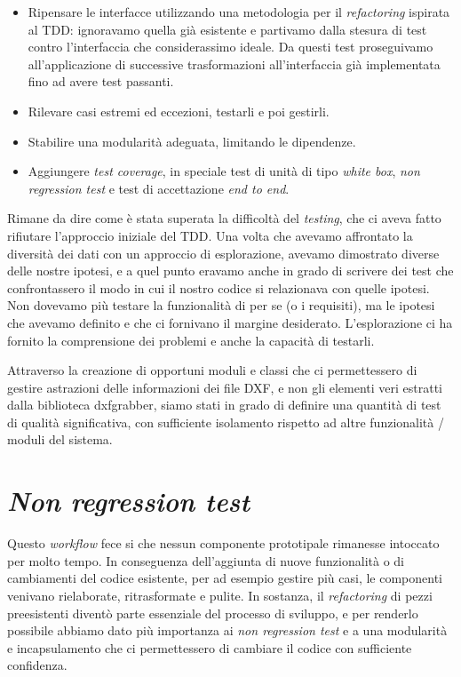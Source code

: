 \documentclass[12pt]{report}
\begin{document}
\begin{itemize}
	\item Ripensare le interfacce utilizzando una metodologia per il \textit{refactoring} ispirata al TDD: ignoravamo quella già esistente e partivamo dalla stesura di test contro l'interfaccia che considerassimo ideale. Da questi test proseguivamo all'applicazione di successive trasformazioni all'interfaccia già implementata fino ad avere test passanti. 
	\item Rilevare casi estremi ed eccezioni, testarli e poi gestirli.
	\item Stabilire una modularità adeguata, limitando le dipendenze.
	\item Aggiungere \textit{test coverage}, in speciale test di unità di tipo \textit{white box}, \textit{non regression test} e test di accettazione \textit{end to end}.
\end{itemize}

Rimane da dire come è stata superata la difficoltà del \textit{testing}, che ci aveva fatto rifiutare l'approccio iniziale del TDD. Una volta che avevamo affrontato la diversità dei dati con un approccio di esplorazione, avevamo dimostrato diverse delle nostre ipotesi, e a quel punto eravamo anche in grado di scrivere dei test che confrontassero il modo in cui il nostro codice si relazionava con quelle ipotesi. Non dovevamo più testare la funzionalità di per se (o i requisiti), ma le ipotesi che avevamo definito e che ci fornivano il margine desiderato. L'esplorazione ci ha fornito la comprensione dei problemi e anche la capacità di testarli.

Attraverso la creazione di opportuni moduli e classi che ci permettessero di gestire astrazioni delle informazioni dei file DXF, e non gli elementi veri estratti dalla biblioteca dxfgrabber, siamo stati in grado di definire una quantità di test di qualità significativa, con sufficiente isolamento rispetto ad altre funzionalità / moduli del sistema.

\section{\textit{Non regression test}}

Questo \textit{workflow} fece si che nessun componente prototipale rimanesse intoccato per molto tempo. In conseguenza dell'aggiunta di nuove funzionalità o di cambiamenti del codice esistente, per ad esempio gestire più casi, le componenti venivano rielaborate, ritrasformate e pulite. In sostanza, il \textit{refactoring} di pezzi preesistenti diventò parte essenziale del processo di sviluppo, e per renderlo possibile abbiamo dato più importanza ai \textit{non regression test} e a una modularità e incapsulamento che ci permettessero di cambiare il codice con sufficiente confidenza. 
\end{document}
